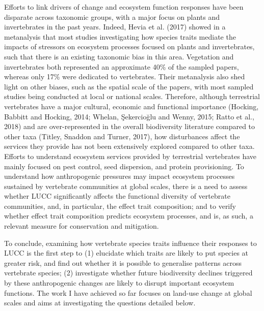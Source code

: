 Efforts to link drivers of change and ecosystem function responses have been disparate across taxonomic groups, with a major focus on plants and invertebrates in the past years. Indeed, Hevia et al. (2017) showed in a metanalysis that most studies investigating how species traits mediate the impacts of stressors on ecosystem processes focused on plants and invertebrates, such that there is an existing taxonomic bias in this area. Vegetation and invertebrates both represented an approximate 40\% of the sampled papers, whereas only 17\% were dedicated to vertebrates. Their metanalysis also shed light on other biases, such as the spatial scale of the papers, with most sampled studies being conducted at local or national scales. Therefore, although terrestrial vertebrates have a major cultural, economic and functional importance (Hocking, Babbitt and Hocking, 2014; Whelan, Şekercioğlu and Wenny, 2015; Ratto et al., 2018) and are over-represented in the overall biodiversity literature compared to other taxa (Titley, Snaddon and Turner, 2017), how disturbances affect the services they provide has not been extensively explored compared to other taxa. Efforts to understand ecosystem services provided by terrestrial vertebrates have mainly focused on pest control, seed dispersion, and protein provisioning. To understand how anthropogenic pressures may impact ecosystem processes sustained by vertebrate communities at global scales, there is a need to assess whether LUCC significantly affects the functional diversity of vertebrate communities, and, in particular, the effect trait composition; and to verify whether effect trait composition predicts ecosystem processes, and is, as such, a relevant measure for conservation and mitigation.

To conclude, examining how vertebrate species traits influence their responses to LUCC is the first step to (1) elucidate which traits are likely to put species at greater risk, and find out whether it is possible to generalise patterns across vertebrate species; (2) investigate whether future biodiversity declines triggered by these anthropogenic changes are likely to disrupt important ecosystem functions. The work I have achieved so far focuses on land-use change at global scales and aims at investigating the questions detailed below.

